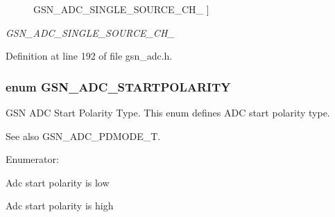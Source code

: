 \begin{Desc}
\begin{description}
{{GSN\_\-ADC\_\-SINGLE\_\-SOURCE\_\-CH\_}
\label{a00643_ggad3668c4c0f4514808fad4505e4f42900a27306be8486f6001ccd2ee7a5af9dbc1}
}]\item[{\em 
\hypertarget{a00643_ggad3668c4c0f4514808fad4505e4f42900a0da0c487fb87c351a41bcd520776ef94}{
GSN\_\-ADC\_\-SINGLE\_\-SOURCE\_\-CH\_\-7}
\label{a00643_ggad3668c4c0f4514808fad4505e4f42900a0da0c487fb87c351a41bcd520776ef94}
}]\end{description}
\end{Desc}



Definition at line 192 of file gsn\_\-adc.h.

\hypertarget{a00643_ga022c151fd88b9ea5c11ad9fbfb415a18}{
\subsubsection[{GSN\_\-ADC\_\-STARTPOLARITY}]{\setlength{\rightskip}{0pt plus 5cm}enum {\bf GSN\_\-ADC\_\-STARTPOLARITY}}}
\label{a00643_ga022c151fd88b9ea5c11ad9fbfb415a18}


GSN ADC Start Polarity Type. This enum defines ADC start polarity type. 

\begin{DoxySeeAlso}{See also}
GSN\_\-ADC\_\-PDMODE\_\-T. 
\end{DoxySeeAlso}
\begin{Desc}
\item[Enumerator: ]\par
\begin{description}
\item[{\em 
\hypertarget{a00643_gga022c151fd88b9ea5c11ad9fbfb415a18a2a1cdbf6fdf55211555c08781bc4cf10}{
GSN\_\-ADC\_\-STARTPOLARITY\_\-L}
\label{a00643_gga022c151fd88b9ea5c11ad9fbfb415a18a2a1cdbf6fdf55211555c08781bc4cf10}
}]Adc start polarity is low \item[{\em 
\hypertarget{a00643_gga022c151fd88b9ea5c11ad9fbfb415a18a01cee9ab8e124df14e2f98208e763730}{
GSN\_\-ADC\_\-STARTPOLARITY\_\-H}
\label{a00643_gga022c151fd88b9ea5c11ad9fbfb415a18a01cee9ab8e124df14e2f98208e763730}
}]Adc start polarity is high \end{description}
\end{Desc}




